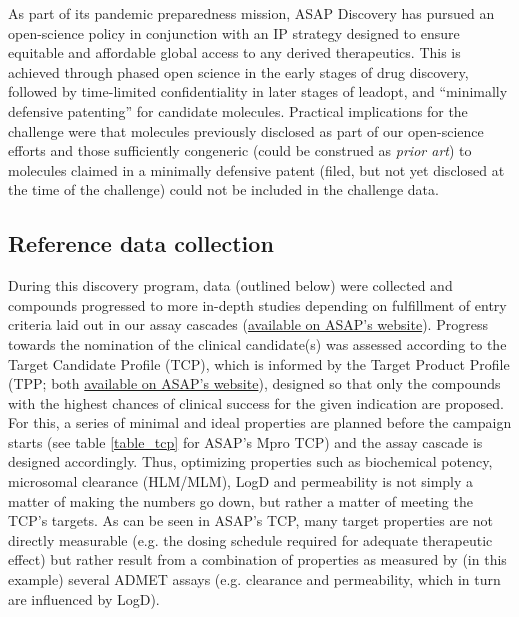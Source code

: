 \documentclass[journal=jcim,manuscript=article]{achemso}
\begin{document}
As part of its pandemic preparedness mission, ASAP Discovery has pursued an open-science policy in conjunction with an IP strategy designed to ensure equitable and affordable global access to any derived therapeutics. This is achieved through phased open science in the early stages of drug discovery, followed by time-limited confidentiality in later stages of leadopt, and “minimally defensive patenting” for candidate molecules\cite{griffen_2024}. Practical implications for the challenge were that molecules previously disclosed as part of our open-science efforts and those sufficiently congeneric (could be construed as \textit{prior art}\cite{ACS_patents}) to molecules claimed in a minimally defensive patent (filed, but not yet disclosed at the time of the challenge) could not be included in the challenge data.

\subsection{Reference data collection}
During this discovery program, data (outlined below) were collected and compounds progressed to more in-depth studies depending on fulfillment of entry criteria laid out in our assay cascades (\href{https://docs.google.com/presentation/d/10tZJvEqpkakq5clvJMawdOTHxPMgimjU7zd0AW11bCg/edit?slide=id.g232fd5f2809_1_114#slide=id.g232fd5f2809_1_114}{available on ASAP's website}). Progress towards the nomination of the clinical candidate(s) was assessed according to the Target Candidate Profile (TCP), which is informed by the Target Product Profile (TPP; both \href{https://docs.google.com/presentation/d/1udzDw0Yo2DQkJcpVpm1jn7rwRpoRvmH_pcXGSl2ztp0/edit?slide=id.g36e536f4044_0_0#slide=id.g36e536f4044_0_0}{available on ASAP's website}), designed so that only the compounds with the highest chances of clinical success for the given indication are proposed. For this, a series of minimal and ideal properties are planned before the campaign starts (see table \ref{table_tcp} for ASAP's Mpro TCP) and the assay cascade is designed accordingly. Thus, optimizing properties such as biochemical potency, microsomal clearance (HLM/MLM), LogD and permeability is not simply a matter of making the numbers go down, but rather a matter of meeting the TCP's targets. As can be seen in ASAP's TCP, many target properties are not directly measurable (e.g. the dosing schedule required for adequate therapeutic effect) but rather result from a combination of properties as measured by (in this example) several ADMET assays (e.g. clearance and permeability, which in turn are influenced by LogD). 
\end{document}
